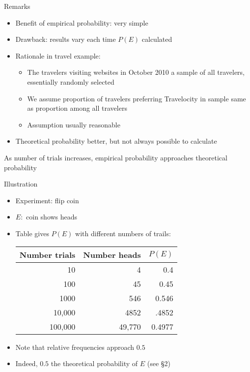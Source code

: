 \documentclass[handout]{beamer}
\theoremstyle{definition}
\begin{document}
\begin{frame}{Remarks}
\begin{itemize}
\item Benefit of empirical probability: very simple
\item Drawback: results vary each time $P\left(E\right)$ calculated
\item Rationale in travel example:
\begin{itemize}
\item The travelers visiting websites in October 2010 a \alert{sample}
of all travelers, essentially \alert{randomly} selected
\item We assume proportion of travelers preferring Travelocity
in sample same as proportion among all travelers
\item Assumption usually reasonable
\end{itemize}
\item Theoretical probability better, but not always possible to calculate
\end{itemize}
\begin{theorem}
As number of trials increases, empirical probability
approaches theoretical probability
\end{theorem}
\end{frame}

\begin{frame}{Illustration}
\begin{itemize}
\item Experiment: flip coin
\item $E:$ coin shows heads
\item Table gives $P\left(E\right)$ with different numbers of trails:
\begin{center}\begin{tabular}{rrr}
Number trials&Number heads&$P\left(E\right)$\\\hline
10&4&0.4\\
100&45&0.45\\
1000&546&0.546\\
10,000&4852&.4852\\
100,000&49,770&0.4977
\end{tabular}\end{center}
\item Note that relative frequencies approach $0.5$
\item Indeed, $0.5$ the theoretical probability of $E$
(see \S2)
\end{itemize}
\end{frame}
\end{document}
